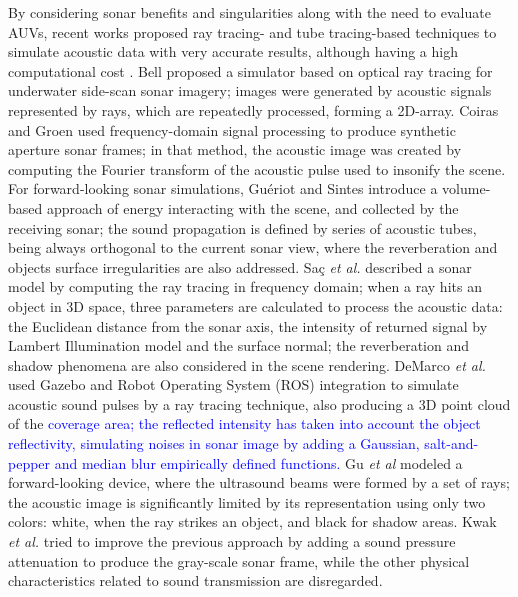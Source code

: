 \documentclass[final,5p,times]{elsarticle}
\begin{document}
By considering sonar benefits and singularities along with the need to
evaluate AUVs, recent works proposed ray tracing- and tube tracing-based
techniques to simulate acoustic data with very accurate results, although
having a high computational cost \cite{bell1997,coiras2009,gueriot2010,sac2015,demarco2015,gu2013,kwak2015}.
Bell \cite{bell1997} proposed a simulator based on optical ray tracing for
underwater side-scan sonar imagery; images were generated by acoustic
signals represented by rays, which are repeatedly processed, forming a
2D-array. Coiras and Groen \cite{coiras2009} used frequency-domain
signal processing to produce synthetic aperture sonar frames; in that method,
the acoustic image was created by computing the Fourier transform of the
acoustic pulse used to insonify the scene. For forward-looking sonar
simulations, Guériot and Sintes \cite{gueriot2010} introduce a volume-based
approach of energy interacting with the scene, and collected by the receiving
sonar; the sound propagation is defined by series of acoustic tubes, being
always orthogonal to the current sonar view, where the reverberation and
objects surface irregularities are also addressed. Saç \textit{et al.}
\cite{sac2015} described a sonar model by computing the ray tracing in
frequency domain; when a ray hits an object in 3D space, three parameters
are calculated to process the acoustic data: the Euclidean distance from
the sonar axis, the intensity of returned signal by Lambert Illumination
model and the surface normal; the reverberation and shadow phenomena are
also considered in the scene rendering. DeMarco \textit{et al.}
\cite{demarco2015} used Gazebo and Robot Operating System (ROS)
\cite{quigley2009} integration to simulate acoustic sound pulses by a
ray tracing technique, also producing a 3D point cloud of the \textcolor{blue}{coverage area; the reflected intensity has taken into account the object reflectivity, simulating noises in sonar image by adding a Gaussian, salt-and-pepper and median blur empirically defined functions.} Gu \textit{et al} \cite{gu2013} modeled a forward-looking device, where the ultrasound beams were formed by a set of rays; the acoustic image is significantly limited by its representation using only two colors: white, when the ray strikes an object, and black for shadow areas. Kwak \textit{et al.} \cite{kwak2015} tried to improve the previous approach by adding a sound pressure attenuation to produce the gray-scale sonar frame, while the other physical characteristics related to sound transmission are disregarded.
\end{document}
